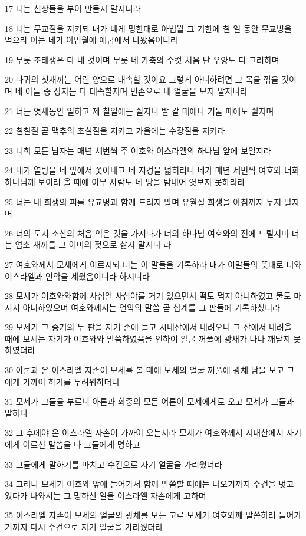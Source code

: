 \par 17 너는 신상들을 부어 만들지 말지니라
\par 18 너는 무교절을 지키되 내가 네게 명한대로 아빕월 그 기한에 칠 일 동안 무교병을 먹으라 이는 네가 아빕월에 애굽에서 나왔음이니라
\par 19 무릇 초태생은 다 내 것이며 무릇 네 가축의 수컷 처음 난 우양도 다 그러하며
\par 20 나귀의 첫새끼는 어린 양으로 대속할 것이요 그렇게 아니하려면 그 목을 꺾을 것이며 네 아들 중 장자는 다 대속할지며 빈손으로 내 얼굴을 보지 말지니라
\par 21 너는 엿새동안 일하고 제 칠일에는 쉴지니 밭 갈 때에나 거둘 때에도 쉴지며
\par 22 칠칠절 곧 맥추의 초실절을 지키고 가을에는 수장절을 지키라
\par 23 너희 모든 남자는 매년 세번씩 주 여호와 이스라엘의 하나님 앞에 보일지라
\par 24 내가 열방을 네 앞에서 쫓아내고 네 지경을 넓히리니 네가 매년 세번씩 여호와 너희 하나님께 보이러 올 때에 아무 사람도 네 땅을 탐내어 엿보지 못하리라
\par 25 너는 내 희생의 피를 유교병과 함께 드리지 말며 유월절 희생을 아침까지 두지 말지며
\par 26 너의 토지 소산의 처음 익은 것을 가져다가 너의 하나님 여호와의 전에 드릴지며 너는 염소 새끼를 그 어미의 젖으로 삶지 말지니 라
\par 27 여호와께서 모세에게 이르시되 너는 이 말들을 기록하라 내가 이말들의 뜻대로 너와 이스라엘과 언약을 세웠음이니라 하시니라
\par 28 모세가 여호와와함께 사십일 사십야를 거기 있으면서 떡도 먹지 아니하였고 물도 마시지 아니하였으며 여호와께서는 언약의 말씀 곧 십계를 그 판들에 기록하셨더라
\par 29 모세가 그 증거의 두 판을 자기 손에 들고 시내산에서 내려오니 그 산에서 내려올 때에 모세는 자기가 여호와와 말씀하였음을 인하여 얼굴 꺼풀에 광채가 나나 깨닫지 못하였더라
\par 30 아론과 온 이스라엘 자손이 모세를 볼 때에 모세의 얼굴 꺼풀에 광채 남을 보고 그에게 가까이 하기를 두려워하더니
\par 31 모세가 그들을 부르니 아론과 회중의 모든 어른이 모세에게로 오고 모세가 그들과 말하니
\par 32 그 후에야 온 이스라엘 자손이 가까이 오는지라 모세가 여호와께서 시내산에서 자기에게 이르신 말씀을 다 그들에게 명하고
\par 33 그들에게 말하기를 마치고 수건으로 자기 얼굴을 가리웠더라
\par 34 그러나 모세가 여호와 앞에 들어가서 함께 말씀할 때에는 나오기까지 수건을 벗고 있다가 나와서는 그 명하신 일을 이스라엘 자손에게 고하며
\par 35 이스라엘 자손이 모세의 얼굴의 광채를 보는 고로 모세가 여호와께 말씀하러 들어가기까지 다시 수건으로 자기 얼굴을 가리웠더라

